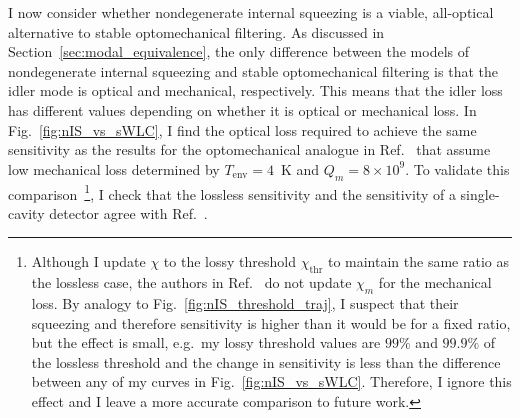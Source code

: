 I now consider whether nondegenerate internal squeezing is a viable, all-optical alternative to stable optomechanical filtering.
As discussed in Section~\ref{sec:modal_equivalence}, the only difference between the models of nondegenerate internal squeezing and stable optomechanical filtering is that the idler mode is optical and mechanical, respectively. This means that the idler loss has different values depending on whether it is optical or mechanical loss. %
In Fig.~\ref{fig:nIS_vs_sWLC}, I find the optical loss required to achieve the same sensitivity as the results for the optomechanical analogue in Ref.~\cite{liBroadbandSensitivityImprovement2020} that assume low mechanical loss determined by $T_\text{env}=4$~K and $Q_m=8\times10^9$. %
To validate this comparison~\footnote{Although I update $\chi$ to the lossy threshold $\chi_\text{thr}$ to maintain the same ratio as the lossless case, the authors in Ref.~\cite{liBroadbandSensitivityImprovement2020} do not update $\chi_m$ for the mechanical loss. By analogy to Fig.~\ref{fig:nIS_threshold_traj}, I suspect that their squeezing and therefore sensitivity is higher than it would be for a fixed ratio, but the effect is small, e.g.\ my lossy threshold values are $99\%$ and $99.9\%$ of the lossless threshold and the change in sensitivity is less than the difference between any of my curves in Fig.~\ref{fig:nIS_vs_sWLC}. Therefore, I ignore this effect and I leave a more accurate comparison to future work.}, I check that the lossless sensitivity and the sensitivity of a single-cavity detector agree with Ref.~\cite{liBroadbandSensitivityImprovement2020}. %
